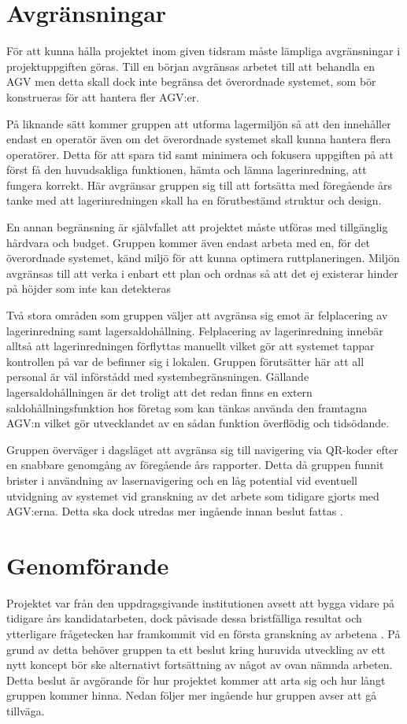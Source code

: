 \documentclass[a4paper,11pt]{article}
\begin{document}
\section{Avgränsningar}

För att kunna hålla projektet inom given tidsram måste lämpliga
avgränsningar i projektuppgiften göras. Till en början avgränsas arbetet
till att behandla en AGV men detta skall dock inte begränsa det överordnade
systemet, som bör konstrueras för att hantera fler AGV:er.

På liknande sätt kommer gruppen att utforma lagermiljön så att den
innehåller endast en operatör även om det överordnade systemet skall kunna
hantera flera operatörer. Detta för att spara tid samt minimera och
fokusera uppgiften på att först få den huvudsakliga funktionen, hämta och
lämna lagerinredning, att fungera korrekt. Här avgränsar gruppen sig till
att fortsätta med föregående års tanke med att lagerinredningen skall ha en
förutbestämd struktur och design.

En annan begränsning är självfallet att projektet måste utföras med
tillgänglig hårdvara och budget. Gruppen kommer även endast arbeta med en,
för det överordnade systemet, känd miljö för att kunna optimera
ruttplaneringen. Miljön avgränsas till att verka i enbart ett plan och
ordnas så att det ej existerar hinder på höjder som inte kan detekteras

Två stora områden som gruppen väljer att avgränsa sig emot är felplacering
av lagerinredning samt lagersaldohållning. Felplacering av lagerinredning
innebär alltså att lagerinredningen förflyttas manuellt vilket gör att
systemet tappar kontrollen på var de befinner sig i lokalen. Gruppen
förutsätter här att all personal är väl införstådd med systembegränsningen.
Gällande lagersaldohållningen är det troligt att det redan finns en extern
saldohållningsfunktion hos företag som kan tänkas använda den framtagna
AGV:n vilket gör utvecklandet av en sådan funktion överflödig och
tidsödande.

Gruppen överväger i dagsläget att avgränsa sig till navigering via QR-koder
efter en snabbare genomgång av föregående års rapporter. Detta då gruppen
funnit brister i användning av lasernavigering och en låg potential vid
eventuell utvidgning av systemet vid granskning av det arbete som tidigare
gjorts med AGV:erna. Detta ska dock utredas mer ingående innan beslut
fattas \cite{kivasystems}.

\section{Genomförande}
Projektet var från den uppdragsgivande institutionen avsett att bygga
vidare på tidigare års kandidatarbeten, dock påvisade dessa bristfälliga
resultat och ytterligare frågetecken har framkommit vid en första
granskning av arbetena \cite{laser,qr}. På grund av detta behöver gruppen
ta ett beslut kring huruvida utveckling av ett nytt koncept bör ske
alternativt fortsättning av något av ovan nämnda arbeten. Detta beslut är
avgörande för hur projektet kommer att arta sig och hur långt gruppen
kommer hinna. Nedan följer mer ingående hur gruppen avser att gå tillväga.
\end{document}
